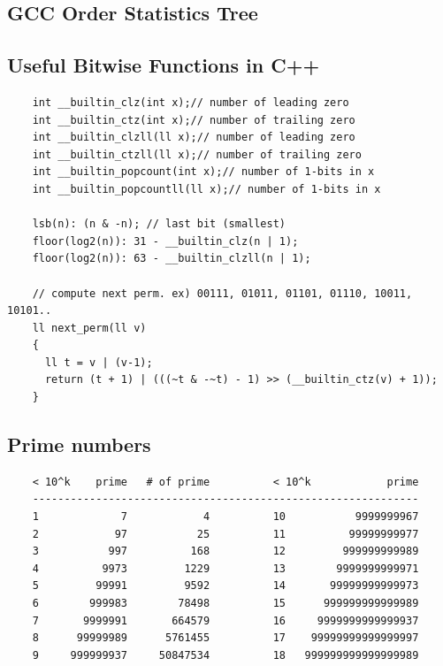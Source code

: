 \documentclass[landscape,8pt]{article}
\begin{document}
\begin{multicols}{2}
  \subsection{GCC Order Statistics Tree}
    
  \subsection{Useful Bitwise Functions in C++}
  \begin{verbatim}
    int __builtin_clz(int x);// number of leading zero
    int __builtin_ctz(int x);// number of trailing zero
    int __builtin_clzll(ll x);// number of leading zero
    int __builtin_ctzll(ll x);// number of trailing zero
    int __builtin_popcount(int x);// number of 1-bits in x
    int __builtin_popcountll(ll x);// number of 1-bits in x

    lsb(n): (n & -n); // last bit (smallest)
    floor(log2(n)): 31 - __builtin_clz(n | 1);
    floor(log2(n)): 63 - __builtin_clzll(n | 1);

    // compute next perm. ex) 00111, 01011, 01101, 01110, 10011, 10101..
    ll next_perm(ll v)
    {
      ll t = v | (v-1);
      return (t + 1) | (((~t & -~t) - 1) >> (__builtin_ctz(v) + 1));
    }
  \end{verbatim}
  \subsection{Prime numbers}
  \begin{verbatim}
    < 10^k    prime   # of prime          < 10^k            prime
    -------------------------------------------------------------
    1             7            4          10           9999999967
    2            97           25          11          99999999977
    3           997          168          12         999999999989
    4          9973         1229          13        9999999999971
    5         99991         9592          14       99999999999973
    6        999983        78498          15      999999999999989
    7       9999991       664579          16     9999999999999937
    8      99999989      5761455          17    99999999999999997
    9     999999937     50847534          18   999999999999999989
  \end{verbatim}

\end{multicols}
\end{document}
